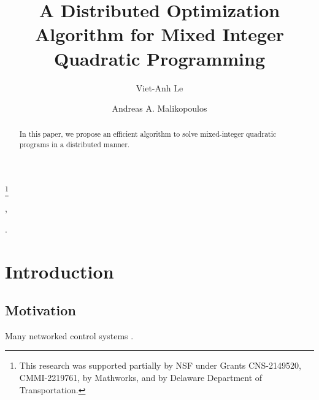 \documentclass[twocolumn,amsthm]{autart}%
\theoremstyle{definition}
\theoremstyle{plain}
\begin{document}
\begin{frontmatter}
\title{A Distributed Optimization Algorithm for Mixed Integer Quadratic Programming} %
\thanks[footnoteinfo]{This research was supported partially by NSF under Grants CNS-2149520, CMMI-2219761, by Mathworks, and by Delaware Department of Transportation.}

\author[UD,SY]{Viet-Anh Le},
\author[CEE]{Andreas A. Malikopoulos}


\address[UD]{Department of Mechanical Engineering, University of Delaware, Newark, DE 19716 USA}
\address[SY]{Systems Engineering Field, Cornell University, Ithaca, NY 14850 USA}
\address[CEE]{School of Civil and Environmental Engineering, Cornell University, Ithaca, NY 14853 USA}

\begin{keyword}                           %
.
\end{keyword}                             %


\begin{abstract}

In this paper, we propose an efficient algorithm to solve mixed-integer quadratic programs in a distributed manner.

\end{abstract}

\end{frontmatter}


\section{Introduction}

\subsection{Motivation}

Many networked control systems \cite{le2024distributed}.
\end{document}
